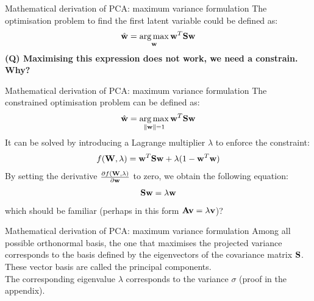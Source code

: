 \documentclass[aspectratio=169,notes]{beamer}
\begin{document}
	\begin{frame}{Mathematical derivation of PCA: maximum variance formulation}
	The optimisation problem to find the first latent variable could be defined as:
	\[
		\hat{{\bf w}} = \operatorname*{arg\,max}_{{\bf w}} {\bf w}^T {\bf S} {\bf w}
	\]
	\leavevmode\newline
	\textbf{(Q) Maximising this expression does not work, we need a constrain. Why?}
	\end{frame}

	\begin{frame}{Mathematical derivation of PCA: maximum variance formulation}
	The constrained optimisation problem can be defined as:
	\[
		\hat{{\bf w}} = \operatorname*{arg\,max}_{\|{\bf w}\|=1} {\bf w}^T {\bf S} {\bf w}
	\]
	It can be solved by introducing a Lagrange multiplier $\lambda$ to enforce the constraint:
	\[
		f({\bf W},\lambda) = {\bf w}^T {\bf S} {\bf w} + \lambda (1-{\bf w}^T{\bf w})
	\]
	By setting the derivative $\frac{\partial f({\bf W},\lambda)}{\partial {\bf w}}$ to zero, we obtain the following equation:
	\[
		{\bf S} {\bf w} = \lambda {\bf w}
	\]
	which should be familiar (perhaps in this form ${\bf A} {\bf v} = \lambda {\bf v}$)?
	\end{frame}

	\begin{frame}{Mathematical derivation of PCA: maximum variance formulation}
	Among all possible orthonormal basis, the one that maximises the projected variance corresponds to the basis defined by the eigenvectors of the covariance matrix ${\bf S}$. These vector basis are called the principal components.\\
	\leavevmode\newline
	The corresponding eigenvalue $\lambda$ corresponds to the variance $\sigma$ (proof in the appendix).
	\end{frame}

\end{document}
